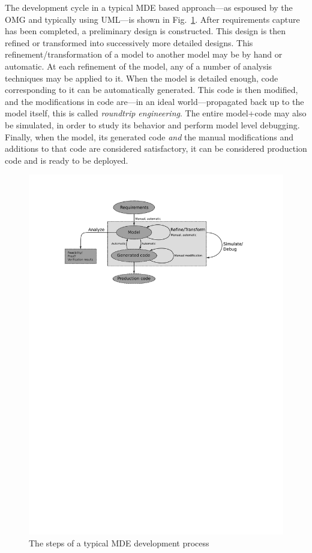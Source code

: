 The development cycle in a typical MDE based approach---as espoused by
the OMG and typically using UML---is shown in
Fig.~\ref{fig:mde_chain}. After requirements capture has been
completed, a preliminary design is constructed. This design is then
refined or transformed into successively more detailed designs. This
refinement/transformation of a model to another model may be by hand
or automatic. At each refinement of the model, any of a number of
analysis techniques may be applied to it. When the model is detailed
enough, code corresponding to it can be automatically generated. This
code is then modified, and the modifications in code are---in an ideal
world---propagated back up to the model itself, this is called
\emph{roundtrip engineering}. The entire model+code may also be
simulated, in order to study its behavior and perform model level
debugging. Finally, when the model, its generated code \emph{and} the
manual modifications and additions to that code are considered
satisfactory, it can be considered production code and is ready to be
deployed.

\begin{figure}
\centering
\includegraphics[scale=1.0]{figs/mde_chain}
\caption{The steps of a typical MDE development process}
\label{fig:mde_chain}
\end{figure}


